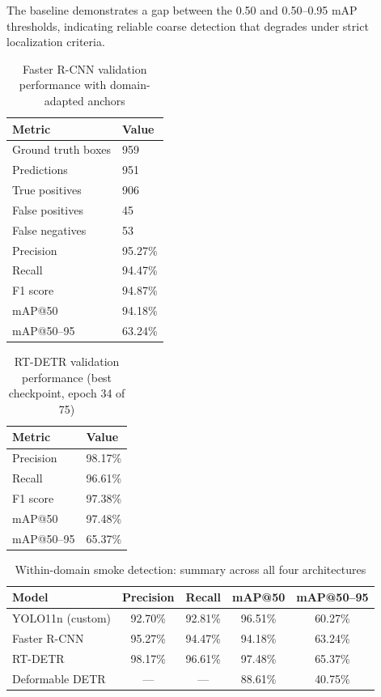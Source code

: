 \documentclass[conference]{IEEEtran}
\begin{document}
The baseline demonstrates a gap between the 0.50 and 0.50--0.95 mAP thresholds, indicating reliable coarse detection that degrades under strict localization criteria.

\begin{table}[htbp]
\centering
\caption{Faster R-CNN validation performance with domain-adapted anchors}
\label{tab:faster_rcnn_val}
\begin{tabularx}{\columnwidth}{lX}
\toprule
Metric & Value \\
\midrule
Ground truth boxes & 959 \\
Predictions & 951 \\
True positives & 906 \\
False positives & 45 \\
False negatives & 53 \\
Precision & 95.27\% \\
Recall & 94.47\% \\
F1 score & 94.87\% \\
mAP@50 & 94.18\% \\
mAP@50--95 & 63.24\% \\
\bottomrule
\end{tabularx}
\end{table}

\begin{table}[htbp]
\centering
\caption{RT-DETR validation performance (best checkpoint, epoch 34 of 75)}
\label{tab:rtdetr_val}
\begin{tabularx}{\columnwidth}{lX}
\toprule
Metric & Value \\
\midrule
Precision  & 98.17\% \\
Recall     & 96.61\% \\
F1 score   & 97.38\% \\
mAP@50     & 97.48\% \\
mAP@50--95 & 65.37\% \\
\bottomrule
\end{tabularx}
\end{table}

\begin{table}[htbp]
\centering
\caption{Within-domain smoke detection: summary across all four architectures}
\label{tab:within_domain_summary}
\setlength{\tabcolsep}{3pt}
\renewcommand{\arraystretch}{1.15}
\footnotesize
\begin{tabular}{@{}p{2.5cm}cccc@{}}
\toprule
Model & Precision & Recall & mAP@50 & mAP@50--95 \\
\midrule
YOLO11n (custom)  & 92.70\% & 92.81\% & 96.51\% & 60.27\% \\
Faster R-CNN      & 95.27\% & 94.47\% & 94.18\% & 63.24\% \\
RT-DETR           & 98.17\% & 96.61\% & 97.48\% & 65.37\% \\
Deformable DETR   & ---     & ---     & 88.61\% & 40.75\% \\
\bottomrule
\end{tabular}
\end{table}
\end{document}
